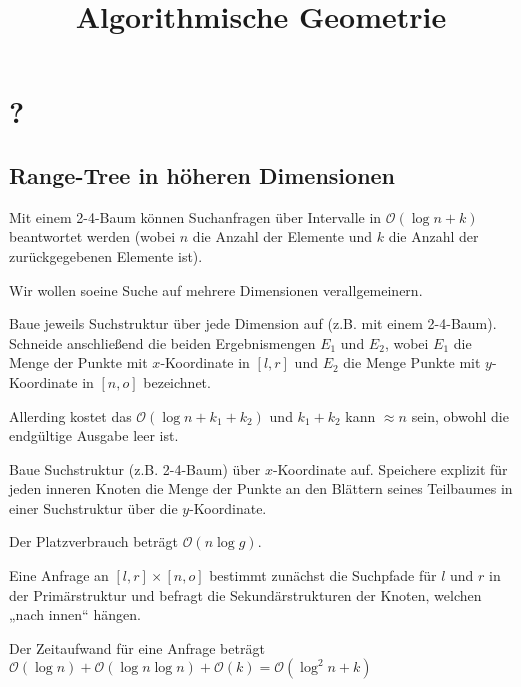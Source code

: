 \documentclass{mycourse}
\title{Algorithmische Geometrie}
\renewcommand{\O}{\mathcal{O}}
\begin{document}
\maketitle
\tableofcontents

\chapter{?}

\section{Range-Tree in höheren Dimensionen}

Mit einem 2-4-Baum können Suchanfragen über Intervalle in $\O(\log n + k)$ beantwortet werden (wobei $n$ die Anzahl der Elemente und $k$ die Anzahl der zurückgegebenen Elemente ist).

Wir wollen soeine Suche auf mehrere Dimensionen verallgemeinern.

\begin{seg}[1. Idee]
	Baue jeweils Suchstruktur über jede Dimension auf (z.B. mit einem 2-4-Baum).
	Schneide anschließend die beiden Ergebnismengen $E_1$ und $E_2$, wobei $E_1$ die Menge der Punkte mit $x$-Koordinate in $[l,r]$ und $E_2$ die Menge Punkte mit $y$-Koordinate in $[n,o]$ bezeichnet.

	Allerding kostet das $\O(\log n + k_1 + k_2)$ und $k_1 + k_2$ kann $\approx n$ sein, obwohl die endgültige Ausgabe leer ist.
\end{seg}

\begin{seg}
	Baue Suchstruktur (z.B. 2-4-Baum) über $x$-Koordinate auf.
	Speichere explizit für jeden inneren Knoten die Menge der Punkte an den Blättern seines Teilbaumes in einer Suchstruktur über die $y$-Koordinate.

	Der Platzverbrauch beträgt $\O(n \log g)$.

	Eine Anfrage an $[l,r] \times [n,o]$ bestimmt zunächst die Suchpfade für $l$ und $r$ in der Primärstruktur und befragt die Sekundärstrukturen der Knoten, welchen „nach innen“ hängen.

	Der Zeitaufwand für eine Anfrage beträgt $\O(\log n) + \O(\log n \log n) + \O(k) = \O(\log^2 n + k)$
\end{seg}
\end{document}

